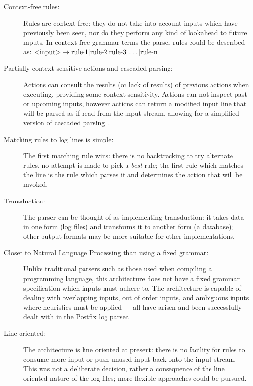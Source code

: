 \documentclass[draft]{svmult}
\begin{document}
\begin{description}

    \item [Context-free rules:]  Rules are context free: they do not take
        into account inputs which have previously been seen, nor do they
        perform any kind of lookahead to future inputs.  In context-free
        grammar terms the parser rules could be described as:
        $\text{\textless{}input\textgreater{}} \mapsto \text{rule-1} |
        \text{rule-2} | \text{rule-3} | \dots | \text{rule-n}$

    \item [Partially context-sensitive actions and cascaded parsing:]
        Actions can consult the results (or lack of results) of previous
        actions when executing, providing some context sensitivity.
        Actions can not inspect past or upcoming inputs, however actions
        can return a modified input line that will be parsed as if read
        from the input stream, allowing for a simplified version of
        cascaded parsing~\cite{cascaded-parsing}.

    \item [Matching rules to log lines is simple:]  The first matching rule
        wins: there is no backtracking to try alternate rules, no attempt
        is made to pick a \textit{best\/} rule; the first rule which
        matches the line is the rule which parses it and determines the
        action that will be invoked.

    \item [Transduction:]  The parser can be thought of as implementing
        transduction: it takes data in one form (log files) and transforms
        it to another form (a database); other output formats may be more
        suitable for other implementations.

    \item [Closer to Natural Language Processing than using a fixed
        grammar:] Unlike traditional parsers such as those used when
        compiling a programming language, this architecture does not have a
        fixed grammar specification which inputs must adhere to.  The
        architecture is capable of dealing with overlapping inputs, out of
        order inputs, and ambiguous inputs where heuristics must be applied
        --- all have arisen and been successfully dealt with in the Postfix
        log parser.

    \item [Line oriented:]  The architecture is line oriented at present:
        there is no facility for rules to consume more input or push unused
        input back onto the input stream.  This was not a deliberate
        decision, rather a consequence of the line oriented nature of the
        log files; more flexible approaches could be pursued.

\end{description}
\end{document}
